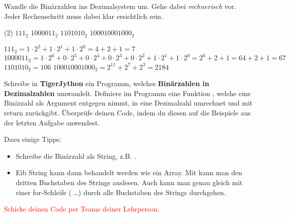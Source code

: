 \newpage

\begin{question}
	Wandle die Binärzahlen ins Dezimalsystem um. Gehe dabei \textit{rechnerisch} vor. Jeder Rechenschritt muss dabei klar ersichtlich sein.
	\begin{tasks}(2)
		\task $111_2$
		\task $1000011_2$
		\task $1101010_2$
		\task $100010001000_2$
	\end{tasks}
\end{question}
\begin{solution}
	\begin{tasks}
		\task $111_2 = 1\cdot2^2+1\cdot2^1+1\cdot2^0 = 4+2+1 = 7$
		\task $1000011_2 = 1\cdot2^6+0\cdot2^5+0\cdot2^4+0\cdot2^3+0\cdot2^2+1\cdot2^1+1\cdot2^0
		= 2^6+2+1=64+2+1=67$
		\task $1101010_2=106$
		\task $100010001000_2 = 2^{11}+2^7+2^3 = 2184$
	\end{tasks}
\end{solution}

\begin{question}
	Schreibe in \textbf{TigerJython} ein Programm, welches \textbf{Binärzahlen in Dezimalzahlen} umwandelt. Definiere im Programm eine Funktion , welche eine Binärzahl  als Argument entgegen nimmt, in eine Dezimalzahl umrechnet und mit return zurückgibt. Überprüfe deinen Code, indem du diesen auf die Beispiele aus der letzten Aufgabe anwendest.

	Dazu einige Tipps:
	\begin{itemize}
		\vspace{-\topsep}
		\item Schreibe die Binärzahl als String,  z.B. .
		\item Eib String kann dann behandelt werden wie ein Array. Mit  kann man den dritten Buchstaben des Strings  auslesen. Auch kann man genau gleich mit einer for-Schleife ( \ldots) durch alle Buchstaben des Strings durchgehen. 
	\end{itemize}		
\end{question}
\begin{solution}
	\textcolor{red}{Schicke deinen Code per Teams deiner Lehrperson.}
\end{solution}

\newpage

